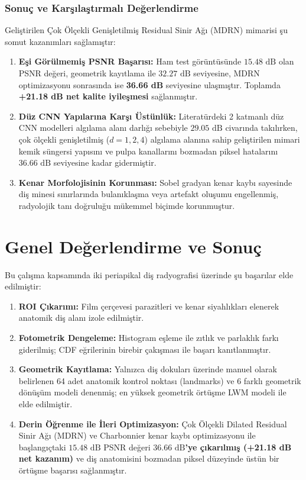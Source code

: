 \documentclass[12pt,a4paper]{article}
\begin{document}
\subsubsection{Sonuç ve Karşılaştırmalı Değerlendirme}
Geliştirilen Çok Ölçekli Genişletilmiş Residual Sinir Ağı (MDRN) mimarisi şu somut kazanımları sağlamıştır:
\begin{enumerate}
    \item \textbf{Eşi Görülmemiş PSNR Başarısı:} Ham test görüntüsünde $15.48\text{ dB}$ olan PSNR değeri, geometrik kayıtlama ile $32.27\text{ dB}$ seviyesine, MDRN optimizasyonu sonrasında ise \textbf{36.66 dB} seviyesine ulaşmıştır. Toplamda \textbf{+21.18 dB net kalite iyileşmesi} sağlanmıştır.
    \item \textbf{Düz CNN Yapılarına Karşı Üstünlük:} Literatürdeki 2 katmanlı düz CNN modelleri algılama alanı darlığı sebebiyle $29.05\text{ dB}$ civarında takılırken, çok ölçekli genişletilmiş ($d=1, 2, 4$) algılama alanına sahip geliştirilen mimari kemik süngersi yapısını ve pulpa kanallarını bozmadan piksel hatalarını $36.66\text{ dB}$ seviyesine kadar gidermiştir.
    \item \textbf{Kenar Morfolojisinin Korunması:} Sobel gradyan kenar kaybı sayesinde diş minesi sınırlarında bulanıklaşma veya artefakt oluşumu engellenmiş, radyolojik tanı doğruluğu mükemmel biçimde korunmuştur.
\end{enumerate}

\newpage
\section{Genel Değerlendirme ve Sonuç}

Bu çalışma kapsamında iki periapikal diş radyografisi üzerinde şu başarılar elde edilmiştir:
\begin{enumerate}
    \item \textbf{ROI Çıkarımı:} Film çerçevesi parazitleri ve kenar siyahlıkları elenerek anatomik diş alanı izole edilmiştir.
    \item \textbf{Fotometrik Dengeleme:} Histogram eşleme ile zıtlık ve parlaklık farkı giderilmiş; CDF eğrilerinin birebir çakışması ile başarı kanıtlanmıştır.
    \item \textbf{Geometrik Kayıtlama:} Yalnızca diş dokuları üzerinde manuel olarak belirlenen 64 adet anatomik kontrol noktası (landmarks) ve 6 farklı geometrik dönüşüm modeli denenmiş; en yüksek geometrik örtüşme LWM modeli ile elde edilmiştir.
    \item \textbf{Derin Öğrenme ile İleri Optimizasyon:} Çok Ölçekli Dilated Residual Sinir Ağı (MDRN) ve Charbonnier kenar kaybı optimizasyonu ile başlangıçtaki $15.48\text{ dB}$ PSNR değeri \textbf{$36.66\text{ dB}$'ye çıkarılmış (+21.18 dB net kazanım)} ve diş anatomisini bozmadan piksel düzeyinde üstün bir örtüşme başarısı sağlanmıştır.
\end{enumerate}
\end{document}
